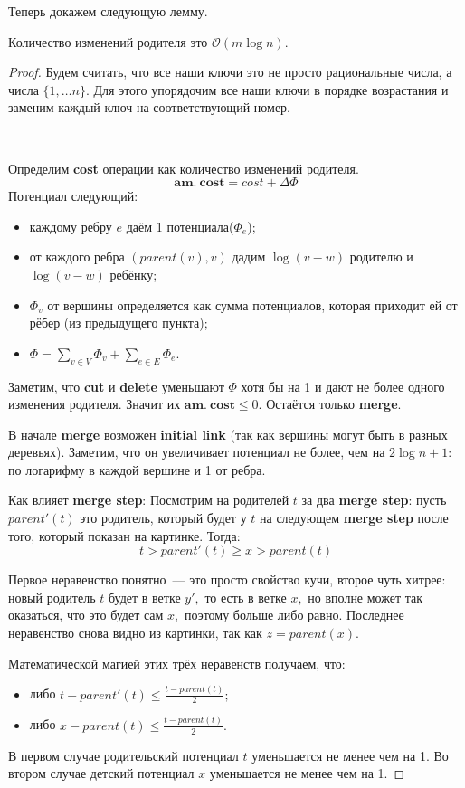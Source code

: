Теперь докажем следующую лемму.
\begin{lemma}
Количество изменений родителя это $\mathcal{O}(m\log{n}).$
\end{lemma}
\begin{proof}
Будем считать, что все наши ключи это не просто рациональные числа, а числа $\{1,\dots n\}.$ Для этого упорядочим все наши ключи в порядке возрастания и заменим каждый ключ на соответствующий номер.

$\quad$

Определим \textbf{cost} операции как количество изменений родителя. 
$$\mathbf{am.\: cost} = cost + \Delta\Phi$$
Потенциал следующий:
\begin{itemize}
    \item каждому ребру $e$ даём 1 потенциала($\Phi_e$);
    \item от каждого ребра $(parent(v), v)$ дадим $\log{(v - w)}$ родителю и $\log{(v - w)}$ ребёнку;
    \item $\Phi_v$ от вершины определяется как сумма потенциалов, которая приходит ей от рёбер (из предыдущего пункта);
    \item $\Phi = \sum\limits_{v\in V}\Phi_v + \sum\limits_{e \in E}\Phi_e.$
    
\end{itemize}
Заметим, что \textbf{cut} и \textbf{delete} уменьшают $\Phi$ хотя бы на 1 и дают не более одного изменения родителя. Значит их $\mathbf{am.\:cost} \leqslant 0.$ Остаётся только \textbf{merge}.

В начале \textbf{merge} возможен \textbf{initial link} (так как вершины могут быть в разных деревьях). Заметим, что он увеличивает потенциал не более, чем на $2\log{n} + 1:$ по логарифму в каждой вершине и 1 от ребра.

Как влияет \textbf{merge step}:
Посмотрим на родителей $t$ за два \textbf{merge step}: пусть $parent'(t)$ это родитель, который будет у $t$ на следующем \textbf{merge step} после того, который показан на картинке. Тогда:
$$t > parent'(t)\geqslant x > parent(t)$$

Первое неравенство понятно~--- это просто свойство кучи, второе чуть хитрее: новый родитель $t$ будет в ветке $y',$ то есть в ветке $x,$ но вполне может так оказаться, что это будет сам $x,$ поэтому больше либо равно. Последнее неравенство снова видно из картинки, так как $z = parent(x).$

Математической магией этих трёх неравенств получаем, что:
\begin{itemize}
    \item либо $t - parent'(t)\leqslant\frac{t - parent(t)}{2};$
    \item либо $x - parent(t)\leqslant \frac{t - parent(t)}{2}.$
\end{itemize}
В первом случае родительский потенциал $t$ уменьшается не менее чем на 1. Во втором случае детский потенциал $x$ уменьшается не менее чем на 1.


\end{proof}
